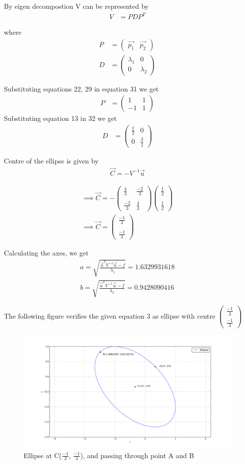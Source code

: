 \documentclass[journal,12pt,twocolumn]{IEEEtran}
\newcommand{\myvec}[1]{\ensuremath{\begin{pmatrix}#1\end{pmatrix}}}
\begin{document}
By eigen decompostion V can be represented by
\begin{align}
    V&=PDP^T
\end{align}

where 
\begin{align}
P&=\myvec{\vec{p_1} & \vec{p_2}}\label{2.32}\\
D&=\myvec{\lambda_1 & 0 \\0 & \lambda_2}
\end{align}

Substituting equations 22, 29 in equation 31 we get 
\begin{align}
    P&=\myvec{1 & 1 \\-1 & 1}
\end{align}
Substituting equation 13 in 32 we get
\begin{align}
       D&=\myvec{\frac{1}{2} & 0\\0 & \frac{3}{2}}
\end{align}

Centre of the ellipse is given by 
\begin{align}
    \vec{C}=-V^{-1}\vec{u}
\end{align}

\begin{align}
    \implies\vec{C}=-\myvec{\frac{4}{3}&\frac{-2}{3}\\\\\frac{-2}{3}&\frac{4}{3}}\myvec{\frac{1}{2}\\\\\frac{1}{2}}\\
    \implies\vec{C}=\myvec{\frac{-1}{3}\\\\\frac{-1}{3}}
\end{align}

Calculating the axes, we get
\begin{align}
a=\sqrt{\frac{\vec{u}^TV^{-1}\vec{u}-f}{\lambda_1}}=1.6329931618\\
b=\sqrt{\frac{\vec{u}^TV^{-1}\vec{u}-f}{\lambda_2}}=0.9428090416
\end{align}

The following figure verifies the given equation 3 as ellipse with centre $\myvec{\frac{-1}{3}\\\frac{-1}{3}}$
\begin{figure}[!ht]
\centering
\includegraphics[width=\columnwidth]{fig.png}
\caption{Ellipse at C($\frac{-1}{3}$, $\frac{-1}{3}$), and passing through point A and B}
\label{Fig}
\end{figure}
\end{document}
